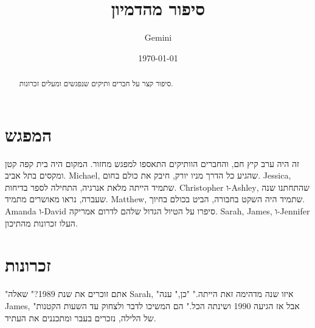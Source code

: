 \documentclass{article}
\begin{document}

\title{סיפור מהדמיון}
\author{\textenglish{Gemini}}
\date{\today}
\maketitle

\begin{abstract}
סיפור קצר על חברים ותיקים שנפגשים ומעלים זכרונות.
\end{abstract}

\section{המפגש}

זה היה ערב קיץ חם, והחברים הוותיקים התאספו למפגש מחזור. המקום היה בית קפה קטן ומקסים בתל אביב.
\newline
\textenglish{Michael}, שהגיע כל הדרך מניו יורק, חיבק את כולם בחום.
\newline
\textenglish{Jessica}, שתמיד הייתה מלאת אנרגיה, התחילה לספר בדיחות.
\newline
\textenglish{Christopher} ו-\textenglish{Ashley}, שהתחתנו שנה שעברה, נראו מאושרים מתמיד.
\newline
\textenglish{Matthew}, שתמיד היה השקט בחבורה, הביט בכולם בחיוך.
\newline
\textenglish{Amanda} ו-\textenglish{David} סיפרו על הטיול הגדול שלהם לדרום אמריקה.
\newline
\textenglish{Sarah}, \textenglish{James}, ו-\textenglish{Jennifer} העלו זכרונות מהתיכון.

\section{זכרונות}

"אתם זוכרים את שנת \textenglish{1989}?" שאלה \textenglish{Sarah}, "איזו שנה מדהימה זאת הייתה."
\newline
"כן," ענה \textenglish{James}, "אבל אז הגיעה \textenglish{1990} ושינתה הכל."
\newline
הם המשיכו לדבר ולצחוק עד השעות הקטנות של הלילה, נזכרים בעבר ומתכננים את העתיד.
\end{document}
